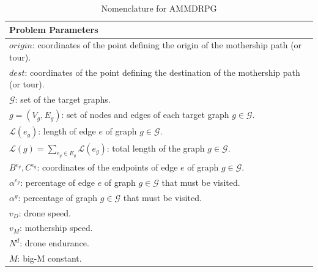  \begin{table}[!h]
\scriptsize
\centering
\begin{tabular}{ | l | }
\hline
\textbf{Problem Parameters}\\
\hline
$origin$: coordinates of the point defining the origin of the mothership path (or tour).\\
$dest$: coordinates of the point defining the destination of the mothership path (or tour).\\
$\mathcal{G}$: set of the target graphs.\\
$g = (V_g, E_g)$: set of nodes and edges of each target graph $g \in \mathcal{G}$.\\
$\mathcal{L}(e_g)$: length of edge $e$ of graph $g \in \mathcal{G}$.\\
$\mathcal{L}(g)=\sum_{e_g\in E_g} \mathcal L(e_g)$: total length of the graph $g\in\mathcal G$.\\
$B^{e_g}, C^{e_g}$: coordinates of the endpoints of edge $e$ of graph $g \in \mathcal{G}$.\\
$\alpha^{e_g}$: percentage of edge $e$ of graph $g \in \mathcal{G}$ that must be visited.\\
$\alpha^{g}$: percentage of graph $g \in \mathcal{G}$ that must be visited.\\
$v_D$: drone speed.\\
$v_M$: mothership speed.\\
$N^d$: drone endurance. \\
$M$: big-M constant.\\
\hline
\end{tabular}
\caption{Nomenclature for AMMDRPG}
\label{table:t1}
\end{table}

